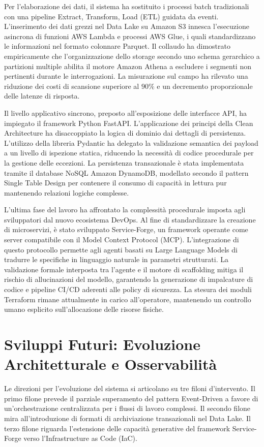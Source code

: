 Per l'elaborazione dei dati, il sistema ha sostituito i processi batch tradizionali con una pipeline Extract, Transform, Load (ETL) guidata da eventi. L'inserimento dei dati grezzi nel Data Lake su Amazon S3 innesca l'esecuzione asincrona di funzioni AWS Lambda e processi AWS Glue, i quali standardizzano le informazioni nel formato colonnare Parquet. Il collaudo ha dimostrato empiricamente che l'organizzazione dello storage secondo uno schema gerarchico a partizioni multiple abilita il motore Amazon Athena a escludere i segmenti non pertinenti durante le interrogazioni. La misurazione sul campo ha rilevato una riduzione dei costi di scansione superiore al $90\%$ e un decremento proporzionale delle latenze di risposta.

Il livello applicativo sincrono, preposto all'esposizione delle interfacce API, ha impiegato il framework Python FastAPI. L'applicazione dei principi della Clean Architecture ha disaccoppiato la logica di dominio dai dettagli di persistenza. L'utilizzo della libreria Pydantic ha delegato la validazione semantica dei payload a un livello di ispezione statica, riducendo la necessità di codice procedurale per la gestione delle eccezioni. La persistenza transazionale è stata implementata tramite il database NoSQL Amazon DynamoDB, modellato secondo il pattern Single Table Design per contenere il consumo di capacità in lettura pur mantenendo relazioni logiche complesse.

L'ultima fase del lavoro ha affrontato la complessità procedurale imposta agli sviluppatori dal nuovo ecosistema DevOps. Al fine di standardizzare la creazione di microservizi, è stato sviluppato Service-Forge, un framework operante come server compatibile con il Model Context Protocol (MCP). L'integrazione di questo protocollo permette agli agenti basati su Large Language Models di tradurre le specifiche in linguaggio naturale in parametri strutturati. La validazione formale interposta tra l'agente e il motore di scaffolding mitiga il rischio di allucinazioni del modello, garantendo la generazione di impalcature di codice e pipeline CI/CD aderenti alle policy di sicurezza. La stesura dei moduli Terraform rimane attualmente in carico all'operatore, mantenendo un controllo umano esplicito sull'allocazione delle risorse fisiche.

\section{Sviluppi Futuri: Evoluzione Architetturale e Osservabilità}
Le direzioni per l'evoluzione del sistema si articolano su tre filoni d'intervento. Il primo filone prevede il parziale superamento del pattern Event-Driven a favore di un'orchestrazione centralizzata per i flussi di lavoro complessi. Il secondo filone mira all'introduzione di formati di archiviazione transazionali nel Data Lake. Il terzo filone riguarda l'estensione delle capacità generative del framework Service-Forge verso l'Infrastructure as Code (IaC).


